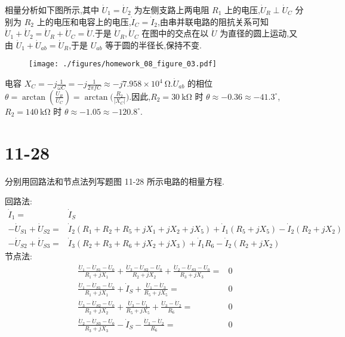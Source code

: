     相量分析如下图所示,其中 $\dot{U}_{1}=\dot{U}_{2}$ 为左侧支路上两电阻 $R_1$ 上的电压,$\dot{U}_{R}\perp \dot{U}_{C}$ 分别为 $R_2$ 上的电压和电容上的电压,$\dot{I}_{C}=\dot{I}_{2}$,由串并联电路的阻抗关系可知 $\dot{U}_{1}+\dot{U}_{2}=\dot{U}_{R}+\dot{U}_{C}=\dot{U}$.于是 $\dot{U}_{R},\dot{U}_{C}$ 在图中的交点在以 $\dot{U}$ 为直径的圆上运动,又由 $\dot{U}_{1}+\dot{U}_{ab}=\dot{U}_{R}$,于是 $U_{ab}$ 等于圆的半径长,保持不变.
    \begin{figure}[htbp]
        \texttt{[image: ./figures/homework\_08\_figure\_03.pdf]}
    \end{figure}

    电容 $X_{C}=-j\frac{1}{\omega C}=-j\frac{1}{2\pi f C}\approx -j7.958\times 10^{4} \ \mathrm{\Omega}$.$\dot{U}_{ab}$ 的相位 $\theta=\arctan{(\frac{U_{R}}{U_{C}})}=\arctan{(\frac{R_2}{|X_{C}|}})$.因此,$R_2=30 \ \mathrm{k\Omega}$ 时 $\theta\approx -0.36\approx -41.3^{\circ}$,$R_2=140 \ \mathrm{k\Omega}$ 时 $\theta\approx -1.05\approx -120.8^{\circ}$.
    \section{11-28} 分别用回路法和节点法列写题图 11-28 所示电路的相量方程.
    \begin{figure}[htbp]
    \end{figure}

    回路法:
    \begin{align}
        \dot{I}_{1}=&\dot{I}_{S}\nonumber\\
        -\dot{U}_{S 1}+\dot{U}_{S 2}=&\dot{I}_{2}(R_1+R_2+R_5+jX_1+jX_2+jX_5)+\dot{I}_{1}(R_5+jX_5)-\dot{I}_{2}(R_2+jX_2)\nonumber\\
        -\dot{U}_{S 2}+\dot{U}_{S 3}=&\dot{I}_{3}(R_2+R_3+R_6+jX_2+jX_3)+\dot{I}_{1}R_6-\dot{I}_{2}(R_2+jX_2)\nonumber
    \end{align}
    节点法:
    \begin{align}
        \frac{\dot{U}_1-\dot{U}_{S 1}-\dot{U}_0}{R_1+jX_1}+\frac{\dot{U}_{3}-\dot{U}_{S 2}-U_{0}}{R_2+jX_2}+\frac{\dot{U}_{2}-\dot{U}_{S 3}-U_0}{R_3+jX_3}=&0\nonumber\\
        \frac{\dot{U}_1-\dot{U}_{S 1}-\dot{U}_0}{R_1+jX_1}+\dot{I}_{S}+\frac{\dot{U}_{1}-\dot{U}_{3}}{R_5+jX_5}=&0\nonumber\\
        \frac{\dot{U}_{3}-\dot{U}_{S 2}-U_{0}}{R_2+jX_2}+\frac{\dot{U}_{3}-\dot{U}_{1}}{R_5+jX_5}+\frac{\dot{U}_{3}-\dot{U}_{2}}{R_6}=&0\nonumber\\
        \frac{\dot{U}_{2}-\dot{U}_{S 3}-U_0}{R_3+jX_3}-\dot{I}_{S}-\frac{\dot{U}_{3}-\dot{U}_{2}}{R_6}=&0\nonumber
    \end{align}
    

